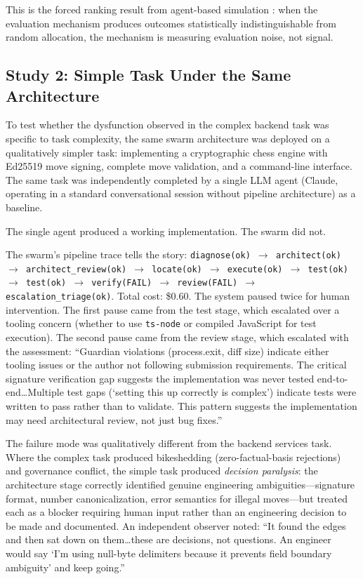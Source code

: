 \documentclass[11pt,a4paper]{article}
\begin{document}
This is the forced ranking result from agent-based simulation \citep{mcentire2025c}: when the evaluation mechanism produces outcomes statistically indistinguishable from random allocation, the mechanism is measuring evaluation noise, not signal.

\subsection{Study 2: Simple Task Under the Same Architecture}

To test whether the dysfunction observed in the complex backend task was specific to task complexity, the same swarm architecture was deployed on a qualitatively simpler task: implementing a cryptographic chess engine with Ed25519 move signing, complete move validation, and a command-line interface. The same task was independently completed by a single LLM agent (Claude, operating in a standard conversational session without pipeline architecture) as a baseline.

The single agent produced a working implementation. The swarm did not.

The swarm's pipeline trace tells the story: \texttt{diagnose(ok) $\to$ architect(ok) $\to$ architect\_review(ok) $\to$ locate(ok) $\to$ execute(ok) $\to$ test(ok) $\to$ test(ok) $\to$ verify(FAIL) $\to$ review(FAIL) $\to$ escalation\_triage(ok)}. Total cost: \$0.60. The system paused twice for human intervention. The first pause came from the test stage, which escalated over a tooling concern (whether to use \texttt{ts-node} or compiled JavaScript for test execution). The second pause came from the review stage, which escalated with the assessment: ``Guardian violations (process.exit, diff size) indicate either tooling issues or the author not following submission requirements. The critical signature verification gap suggests the implementation was never tested end-to-end\ldots Multiple test gaps (`setting this up correctly is complex') indicate tests were written to pass rather than to validate. This pattern suggests the implementation may need architectural review, not just bug fixes.''

The failure mode was qualitatively different from the backend services task. Where the complex task produced bikeshedding (zero-factual-basis rejections) and governance conflict, the simple task produced \emph{decision paralysis}: the architecture stage correctly identified genuine engineering ambiguities---signature format, number canonicalization, error semantics for illegal moves---but treated each as a blocker requiring human input rather than an engineering decision to be made and documented. An independent observer noted: ``It found the edges and then sat down on them\ldots these are decisions, not questions. An engineer would say `I'm using null-byte delimiters because it prevents field boundary ambiguity' and keep going.''
\end{document}
